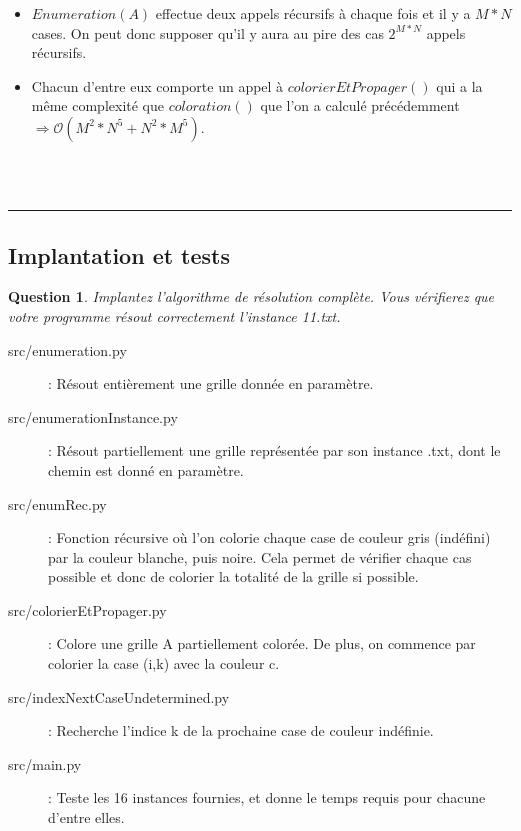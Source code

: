 \documentclass[a4paper,12pt]{article}
\newtheorem{exo}{Question}
\begin{document}
\begin{itemize}
	\item $Enumeration(A)$ effectue deux appels récursifs à chaque fois et il y a $M*N$ cases. On peut donc supposer qu'il y aura au pire des cas $2^{M*N}$ appels récursifs. 
	\item Chacun d'entre eux comporte un appel à $colorierEtPropager()$ qui a la même complexité que $coloration()$ que l'on a calculé précédemment \\$\Rightarrow \mathcal{O}(M^2*N^5 + N^2*M^5)$.\\
\end{itemize}

\\\\

\noindent\rule{\textwidth}{1pt}


\subsection{Implantation et tests}

\begin{exo}
	Implantez l'algorithme de résolution complète. Vous vérifierez que votre programme résout correctement l'instance 11.txt.
\end{exo}

\begin{description}
	\item[src/enumeration.py] : Résout entièrement une grille donnée en paramètre.
	\item[src/enumerationInstance.py] : Résout partiellement une grille représentée par son instance .txt, dont le chemin est donné en paramètre.
	\item[src/enumRec.py] : Fonction récursive où l'on colorie chaque case de couleur gris (indéfini) par la couleur blanche, puis noire. Cela permet de vérifier chaque cas possible et donc de colorier la totalité de la grille si possible.
	\item[src/colorierEtPropager.py] : Colore une grille A partiellement colorée. De plus, on commence par colorier la case (i,k) avec la couleur c.
	\item[src/indexNextCaseUndetermined.py] : Recherche l'indice k de la prochaine case de couleur indéfinie.
	\item[src/main.py] : Teste les 16 instances fournies, et donne le temps requis pour chacune d'entre elles.
\end{description}
\end{document}
